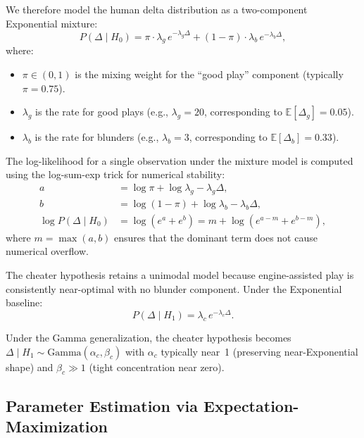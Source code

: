 \documentclass[11pt,a4paper]{article}
\newcommand{\E}{\mathbb{E}}
\begin{document}
We therefore model the human delta distribution as a two-component Exponential
mixture:
\begin{equation}
    P(\Delta \mid H_0) = \pi \cdot \lambda_g \, e^{-\lambda_g \Delta}
    + (1 - \pi) \cdot \lambda_b \, e^{-\lambda_b \Delta},
    \label{eq:mixture_pdf}
\end{equation}
where:
\begin{itemize}
    \item $\pi \in (0, 1)$ is the mixing weight for the ``good play'' component
          (typically $\pi = 0.75$).
    \item $\lambda_g$ is the rate for good plays (e.g., $\lambda_g = 20$,
          corresponding to $\E[\Delta_g] = 0.05$).
    \item $\lambda_b$ is the rate for blunders (e.g., $\lambda_b = 3$,
          corresponding to $\E[\Delta_b] = 0.33$).
\end{itemize}

The log-likelihood for a single observation under the mixture model is computed
using the log-sum-exp trick for numerical stability:
\begin{align}
    a &= \log \pi + \log \lambda_g - \lambda_g \Delta, \label{eq:log_comp_good}\\
    b &= \log(1 - \pi) + \log \lambda_b - \lambda_b \Delta, \label{eq:log_comp_blunder}\\
    \log P(\Delta \mid H_0) &= \log\!\left(e^a + e^b\right)
    = m + \log\!\left(e^{a-m} + e^{b-m}\right),
    \label{eq:log_mixture}
\end{align}
where $m = \max(a, b)$ ensures that the dominant term does not cause numerical
overflow.

The cheater hypothesis retains a unimodal model because engine-assisted play
is consistently near-optimal with no blunder component. Under the Exponential
baseline:
\begin{equation}
    P(\Delta \mid H_1) = \lambda_c \, e^{-\lambda_c \Delta}.
    \label{eq:cheater_pdf}
\end{equation}

Under the Gamma generalization, the cheater hypothesis becomes
$\Delta \mid H_1 \sim \text{Gamma}(\alpha_c, \beta_c)$ with $\alpha_c$
typically near~1 (preserving near-Exponential shape) and $\beta_c \gg 1$
(tight concentration near zero).

\subsection{Parameter Estimation via Expectation-Maximization}
\label{sec:em}
\end{document}
